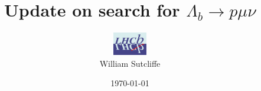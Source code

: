 \documentclass{beamer}
\begin{document}
{


\title[ Update on search for $\Lambda_{b} \rightarrow p \mu \nu$ \hspace{2em}\insertframenumber/
\inserttotalframenumber]{Update on search for $\Lambda_{b} \rightarrow p \mu \nu$}
\author[William Sutcliffe]{\includegraphics[height=1cm,width=1.5cm]{lhcblogo.jpg} \\ William Sutcliffe}

\date{\today}


 \frame{\titlepage

} 








}
\end{document}
